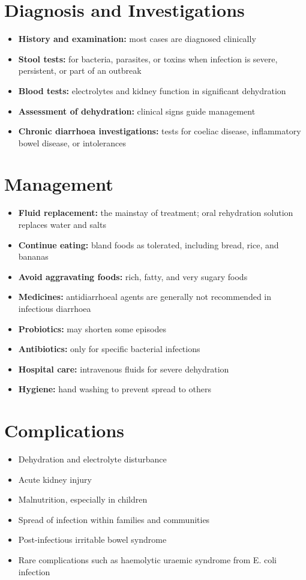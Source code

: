 \section*{Diagnosis and Investigations}
\begin{itemize}
    \item \textbf{History and examination:} most cases are diagnosed clinically
    \item \textbf{Stool tests:} for bacteria, parasites, or toxins when infection is severe, persistent, or part of an outbreak
    \item \textbf{Blood tests:} electrolytes and kidney function in significant dehydration
    \item \textbf{Assessment of dehydration:} clinical signs guide management
    \item \textbf{Chronic diarrhoea investigations:} tests for coeliac disease, inflammatory bowel disease, or intolerances
\end{itemize}

\section*{Management}
\begin{itemize}
    \item \textbf{Fluid replacement:} the mainstay of treatment; oral rehydration solution replaces water and salts
    \item \textbf{Continue eating:} bland foods as tolerated, including bread, rice, and bananas
    \item \textbf{Avoid aggravating foods:} rich, fatty, and very sugary foods
    \item \textbf{Medicines:} antidiarrhoeal agents are generally not recommended in infectious diarrhoea
    \item \textbf{Probiotics:} may shorten some episodes
    \item \textbf{Antibiotics:} only for specific bacterial infections
    \item \textbf{Hospital care:} intravenous fluids for severe dehydration
    \item \textbf{Hygiene:} hand washing to prevent spread to others
\end{itemize}

\section*{Complications}
\begin{itemize}
    \item Dehydration and electrolyte disturbance
    \item Acute kidney injury
    \item Malnutrition, especially in children
    \item Spread of infection within families and communities
    \item Post-infectious irritable bowel syndrome
    \item Rare complications such as haemolytic uraemic syndrome from E. coli infection
\end{itemize}

